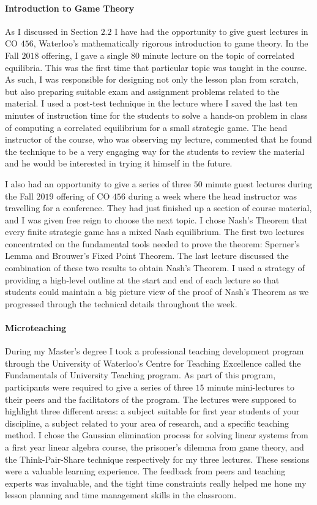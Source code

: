 \documentclass{article}
\begin{document}
\paragraph{Introduction to Game Theory}
As I discussed in Section $2.2$ I have had the opportunity to give guest lectures in CO $456$, Waterloo's mathematically rigorous introduction to game theory. In the Fall $2018$ offering, I gave a single $80$ minute lecture on the topic of correlated equilibria. This was the first time that particular topic was taught in the course. As such, I was responsible for designing not only the lesson plan from scratch, but also preparing suitable exam and assignment problems related to the material. I used a post-test technique in the lecture where I saved the last ten minutes of instruction time for the students to solve a hands-on problem in class of computing a correlated equilibrium for a small strategic game. The head instructor of the course, who was observing my lecture, commented that he found the technique to be a very engaging way for the students to review the material and he would be interested in trying it himself in the future.

I also had an opportunity to give a series of three $50$ minute guest lectures during the Fall $2019$ offering of CO $456$ during a week where the head instructor was travelling for a conference. They had just finished up a section of course material, and I was given free reign to choose the next topic. I chose Nash's Theorem that every finite strategic game has a mixed Nash equilibrium. The first two lectures concentrated on the fundamental tools needed to prove the theorem: Sperner's Lemma and Brouwer's Fixed Point Theorem. The last lecture discussed the combination of these two results to obtain Nash's Theorem. I used a strategy of providing a high-level outline at the start and end of each lecture so that students could maintain a big picture view of the proof of Nash's Theorem as we progressed through the technical details throughout the week.

\paragraph{Microteaching} During my Master's degree I took a professional teaching development program through the University of Waterloo's Centre for Teaching Excellence called the Fundamentals of University Teaching program. As part of this program, participants were required to give a series of three $15$ minute mini-lectures to their peers and the facilitators of the program. The lectures were supposed to highlight three different areas: a subject suitable for first year students of your discipline, a subject related to your area of research, and a specific teaching method. I chose the Gaussian elimination process for solving linear systems from a first year linear algebra course, the prisoner's dilemma from game theory, and the Think-Pair-Share technique respectively for my three lectures. These sessions were a valuable learning experience. The feedback from peers and teaching experts was invaluable, and the tight time constraints really helped me hone my lesson planning and time management skills in the classroom. 
\end{document}
